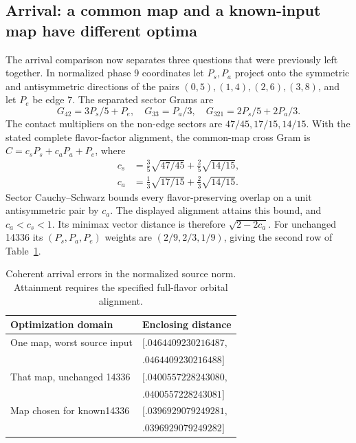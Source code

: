 \subsection{Arrival: a common map and a known-input map have different optima}
\label{sec:arrival-optima-12}

The arrival comparison now separates three questions that were previously
left together. In normalized phase 9 coordinates let $P_s,P_a$ project onto
the symmetric and antisymmetric directions of the pairs $(0,5),(1,4),
(2,6),(3,8)$, and let $P_e$ be edge 7. The separated sector Grams are
\begin{equation}
 G_{42}=3P_s/5+P_e,\quad G_{33}=P_a/3,\quad
 G_{321}=2P_s/5+2P_a/3.
\end{equation}
The contact multipliers on the non-edge sectors are $47/45,17/15,14/15$.
With the stated complete flavor-factor alignment, the common-map cross
Gram is $C=c_sP_s+c_aP_a+P_e$, where
\begin{align}
 c_s&=\tfrac35\sqrt{47/45}+\tfrac25\sqrt{14/15},\\
 c_a&=\tfrac13\sqrt{17/15}+\tfrac23\sqrt{14/15}.
\end{align}
Sector Cauchy--Schwarz bounds every flavor-preserving overlap on a unit
antisymmetric pair by $c_a$. The displayed alignment attains this bound,
and $c_a<c_s<1$. Its minimax vector distance is therefore
$\sqrt{2-2c_a}$. For unchanged 14336 its $(P_s,P_a,P_e)$ weights are
$(2/9,2/3,1/9)$, giving the second row of
Table~\ref{tab:arrival-optima-12}.

\begin{table}[htbp]\centering\small
\caption{Coherent arrival errors in the normalized source norm.
Attainment requires the specified full-flavor orbital alignment.}
\begin{tabular}{p{1.65in}l}\toprule
Optimization domain & Enclosing distance\\\midrule
One map, worst source input&$[.0464409230216487,$\\
 &$ .0464409230216488]$\\
That map, unchanged 14336&$[.0400557228243080,$\\
 &$ .0400557228243081]$\\
Map chosen for known14336&$[.0396929079249281,$\\
 &$ .0396929079249282]$\\\bottomrule
\end{tabular}\label{tab:arrival-optima-12}
\end{table}

